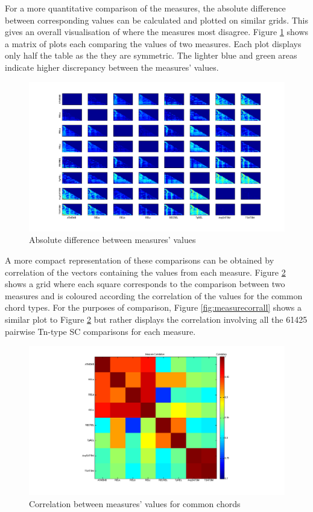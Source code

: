 \documentclass{article}
\begin{document}
For a more quantitative comparison of the measures, the absolute
difference between corresponding values can be calculated and plotted
on similar grids. This gives an overall visualisation of where the
measures most disagree. Figure \ref{fig:absdiff} shows a matrix of
plots each comparing the values of two measures. Each plot displays
only half the table as the they are symmetric. The lighter blue and
green areas indicate higher discrepancy between the measures' values.

\begin{figure}[htb]
 \centering
 \includegraphics[scale=0.25]{../plots/Measure_comparisons.png}
 \caption{\label{fig:absdiff}Absolute difference between measures' values}
 \end{figure} 

A more compact representation of these comparisons can be obtained by
correlation of the vectors containing the values from each
measure. Figure \ref{fig:measurecorrchords} shows a grid where each
square corresponds to the comparison between two measures and is
coloured according the correlation of the values for the common chord
types. For the purposes of comparison, Figure \ref{fig:measurecorrall}
shows a similar plot to Figure \ref{fig:measurecorrchords} but rather
displays the correlation involving all the 61425 pairwise Tn-type SC
comparisons for each measure.

\begin{figure}[htb]
\centering
\includegraphics[scale=0.2]{../plots/Measure_Correlation.png}
\caption{\label{fig:measurecorrchords}Correlation between measures' values for common chords}
\end{figure}
\end{document}
